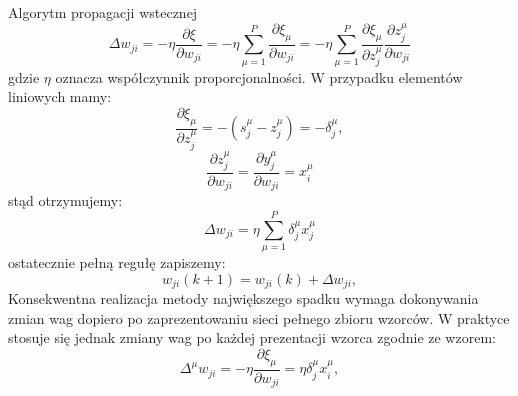 \begin{easyappendix}{Algorytm propagacji wstecznej}
\begin{equation}
       \Delta w_{ji} = -\eta \frac{\partial\xi}{\partial w_{ji}} = -\eta \sum ^{P}_{\mu=1} \frac {\partial \xi_\mu}{\partial w_{ji}} = -\eta \sum ^{P}_{\mu=1} \frac {\partial \xi_\mu}{\partial z^\mu_j} \frac{\partial z_j^\mu}{\partial w_{ji}}
\end{equation}
gdzie \(\eta\) oznacza współczynnik proporcjonalności.
W przypadku elementów liniowych mamy:
\begin{equation}
       \frac{\partial\xi_\mu}{\partial z^\mu_j} = -(s^\mu_j-z^\mu_j) = -\delta^\mu_j, 
\end{equation}
\begin{equation}
       \frac{\partial z_j^\mu}{\partial w_{ji}} = \frac{\partial y^\mu_j}{\partial w_{ji} } = x _i^\mu
\end{equation}
stąd otrzymujemy:
\begin{equation}
       \Delta w_{ji} = \eta \sum_{\mu=1}^{P} \delta^\mu_j x^\mu_j
\end{equation}
ostatecznie pełną regułę zapiszemy:
\begin{equation}
       w_{ji}(k+1)  = w_{ji}(k) + \Delta w_{ji},
\end{equation}
Konsekwentna realizacja metody największego spadku wymaga dokonywania zmian wag dopiero po zaprezentowaniu sieci pełnego zbioru wzorców. W praktyce stosuje się jednak zmiany wag po każdej prezentacji wzorca zgodnie ze wzorem:
\begin{equation}
       \Delta ^\mu w_{ji} = -\eta \frac {\partial \xi _\mu}{\partial w_{ji}} = \eta \delta _j ^\mu x^\mu_i,
\end{equation}

\end{easyappendix}



